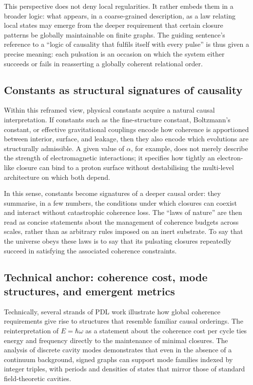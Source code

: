 \documentclass[11pt,a4paper]{article}
\theoremstyle{definition}
\begin{document}
This perspective does not deny local regularities. It rather embeds them in a broader logic: what appears, in a coarse-grained description, as a law relating local states may emerge from the deeper requirement that certain closure patterns be globally maintainable on finite graphs.\cite{Laubscher_PDL_GlobalMapping_v6_2024} The guiding sentence’s reference to a ``logic of causality that fulfils itself with every pulse'' is thus given a precise meaning: each pulsation is an occasion on which the system either succeeds or fails in reasserting a globally coherent relational order.

\subsection{Constants as structural signatures of causality}

Within this reframed view, physical constants acquire a natural causal interpretation. If constants such as the fine-structure constant, Boltzmann’s constant, or effective gravitational couplings encode how coherence is apportioned between interior, surface, and leakage, then they also encode which evolutions are structurally admissible.\cite{Laubscher_Alpha_v2_2024,Laubscher_UniversalCoherenceLeakage_2024,Laubscher_PDL_Position_2024} A given value of \(\alpha\), for example, does not merely describe the strength of electromagnetic interactions; it specifies how tightly an electron-like closure can bind to a proton surface without destabilising the multi-level architecture on which both depend.\cite{Laubscher_Alpha_v2_2024,Laubscher_Born_Golden_v2_2024}

In this sense, constants become signatures of a deeper causal order: they summarise, in a few numbers, the conditions under which closures can coexist and interact without catastrophic coherence loss. The ``laws of nature'' are then read as concise statements about the management of coherence budgets across scales, rather than as arbitrary rules imposed on an inert substrate.\cite{Laubscher_PDL_GlobalMapping_v6_2024} To say that the universe obeys these laws is to say that its pulsating closures repeatedly succeed in satisfying the associated coherence constraints.

\subsection{Technical anchor: coherence cost, mode structures, and emergent metrics}

Technically, several strands of PDL work illustrate how global coherence requirements give rise to structures that resemble familiar causal orderings. The reinterpretation of \(E = \hbar \omega\) as a statement about the coherence cost per cycle ties energy and frequency directly to the maintenance of minimal closures.\cite{Laubscher_EmergencePhysicalReality_2024,Laubscher_Schrodinger_Compat_v2_2024} The analysis of discrete cavity modes demonstrates that even in the absence of a continuum background, signed graphs can support mode families indexed by integer triples, with periods and densities of states that mirror those of standard field-theoretic cavities.\cite{Laubscher_CavityModes_PDL_2024}
\end{document}
